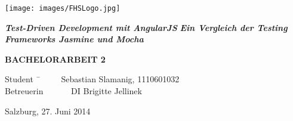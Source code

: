 \begin{titlepage}
\begin{center}

\texttt{[image: images/FHSLogo.jpg]}

\vspace*{4cm}

\Large{
  \textit{\textbf{Test-Driven Development mit AngularJS}}
}
\newline
\large{
  \textit{\textbf{Ein Vergleich der Testing Frameworks Jasmine und Mocha}}
}

\vspace*{4cm}

\large{
  \textbf{BACHELORARBEIT 2}
}

\end{center}

\vfill

\begin{tabbing}
Student \= \ \ \ \ \ \ Sebastian Slamanig, 1110601032 \\
Betreuerin \> \ \ \ \ \ \ DI Brigitte Jellinek
\end{tabbing}

Salzburg, 27. Juni 2014

\end{titlepage}